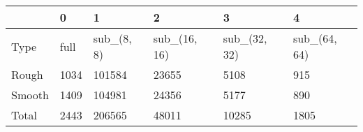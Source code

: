 \begin{tabular}{llllll}
\toprule
{} &     0 &           1 &             2 &             3 &             4 \\
\midrule
Type   &  full &  sub\_(8, 8) &  sub\_(16, 16) &  sub\_(32, 32) &  sub\_(64, 64) \\
Rough  &  1034 &      101584 &         23655 &          5108 &           915 \\
Smooth &  1409 &      104981 &         24356 &          5177 &           890 \\
Total  &  2443 &      206565 &         48011 &         10285 &          1805 \\
\bottomrule
\end{tabular}
